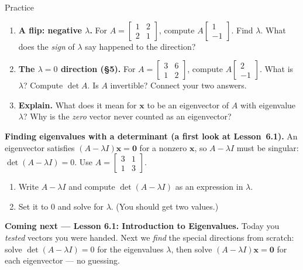 \documentclass[10pt]{article}
\newcommand{\xx}{\mathbf{x}}
\newcommand{\zero}{\mathbf{0}}
\begin{document}
\begin{notesbox}{Practice}
\begin{enumerate}[leftmargin=1.9em, itemsep=12pt]
\begin{enumerate}[label=(\alph*), leftmargin=1.8em, itemsep=4pt]
    \end{enumerate}
    \vspace{1.1cm}
  \item \textbf{A flip: negative $\lambda$.} For $A=\begin{bmatrix} 1 & 2 \\ 2 & 1 \end{bmatrix}$,
        compute $A\begin{bmatrix} 1 \\ -1 \end{bmatrix}$. Find $\lambda$. What does the \emph{sign} of
        $\lambda$ say happened to the direction? 
  \item \textbf{The $\lambda=0$ direction (§5).} For $A=\begin{bmatrix} 3 & 6 \\ 1 & 2 \end{bmatrix}$,
        compute $A\begin{bmatrix} 2 \\ -1 \end{bmatrix}$. What is $\lambda$? Compute $\det A$. Is $A$
        invertible? Connect your two answers. 
  \item \textbf{Explain.} What does it mean for $\xx$ to be an eigenvector of $A$ with eigenvalue
        $\lambda$? Why is the \emph{zero} vector never counted as an eigenvector? 
\end{enumerate}
\end{notesbox}

\begin{extensionbox}
\textbf{Finding eigenvalues with a determinant (a first look at Lesson~6.1).} An eigenvector satisfies
$(A-\lambda I)\xx=\zero$ for a nonzero $\xx$, so $A-\lambda I$ must be singular: $\det(A-\lambda I)=0$.
Use $A=\begin{bmatrix} 3 & 1 \\ 1 & 3 \end{bmatrix}$.
\begin{enumerate}[label=(\alph*), leftmargin=1.8em, itemsep=5pt]
  \item Write $A-\lambda I$ and compute $\det(A-\lambda I)$ as an expression in $\lambda$.
  \item Set it to $0$ and solve for $\lambda$. (You should get two values.)
\end{enumerate}
\end{extensionbox}

\begin{spiralbox}
\textbf{Coming next --- Lesson 6.1: Introduction to Eigenvalues.} Today you \emph{tested} vectors you
were handed. Next we \emph{find} the special directions from scratch: solve $\det(A-\lambda I)=0$ for
the eigenvalues $\lambda$, then solve $(A-\lambda I)\xx=\zero$ for each eigenvector --- no guessing.
\end{spiralbox}
\end{document}
